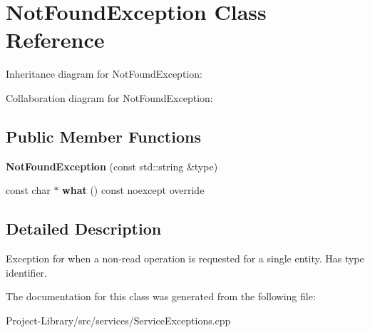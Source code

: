 \hypertarget{classNotFoundException}{}\section{Not\+Found\+Exception Class Reference}
\label{classNotFoundException}


Inheritance diagram for Not\+Found\+Exception\+:


Collaboration diagram for Not\+Found\+Exception\+:
\subsection*{Public Member Functions}
\begin{DoxyCompactItemize}
\item 
\mbox{\label{classNotFoundException_a1990b38983e93cf3c3e71d83ebbbf778}} 
{\bfseries Not\+Found\+Exception} (const std\+::string \&type)
\item 
\mbox{\label{classNotFoundException_a1d47c25e31595e59e5796bc5e6bff034}} 
const char $\ast$ {\bfseries what} () const noexcept override
\end{DoxyCompactItemize}


\subsection{Detailed Description}
Exception for when a non-\/read operation is requested for a single entity. Has type identifier. 

The documentation for this class was generated from the following file\+:\begin{DoxyCompactItemize}
\item 
Project-\/\+Library/src/services/Service\+Exceptions.\+cpp\end{DoxyCompactItemize}
